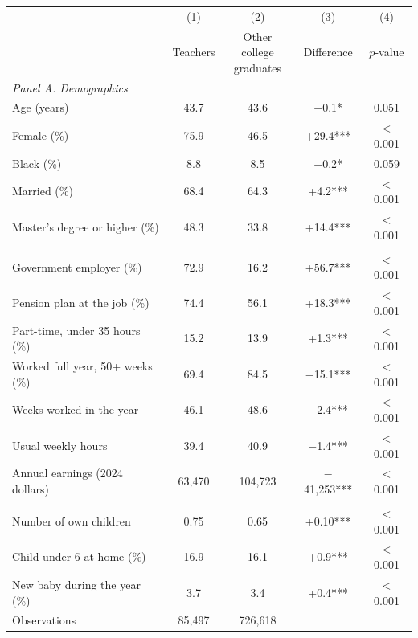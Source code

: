 \begin{tabular}{lcccc}
\toprule
 & (1) & (2) & (3) & (4) \\
 & Teachers & \makecell{Other college\\graduates} & Difference & $p$-value \\
\midrule
\multicolumn{5}{l}{\textit{Panel A. Demographics}} \\
Age (years) & 43.7 & 43.6 & +0.1* & 0.051 \\
Female (\%) & 75.9 & 46.5 & +29.4*** & $<$0.001 \\
Black (\%) & 8.8 & 8.5 & +0.2* & 0.059 \\
Married (\%) & 68.4 & 64.3 & +4.2*** & $<$0.001 \\
Master's degree or higher (\%) & 48.3 & 33.8 & +14.4*** & $<$0.001 \\
\addlinespace
\multicolumn{5}{l}{\textit{Panel B. The job}} \\
Government employer (\%) & 72.9 & 16.2 & +56.7*** & $<$0.001 \\
Pension plan at the job (\%) & 74.4 & 56.1 & +18.3*** & $<$0.001 \\
Part-time, under 35 hours (\%) & 15.2 & 13.9 & +1.3*** & $<$0.001 \\
Worked full year, 50+ weeks (\%) & 69.4 & 84.5 & $-$15.1*** & $<$0.001 \\
Weeks worked in the year & 46.1 & 48.6 & $-$2.4*** & $<$0.001 \\
Usual weekly hours & 39.4 & 40.9 & $-$1.4*** & $<$0.001 \\
Annual earnings (2024 dollars) & 63,470 & 104,723 & $-$41,253*** & $<$0.001 \\
\addlinespace
\multicolumn{5}{l}{\textit{Panel C. Family}} \\
Number of own children & 0.75 & 0.65 & +0.10*** & $<$0.001 \\
Child under 6 at home (\%) & 16.9 & 16.1 & +0.9*** & $<$0.001 \\
New baby during the year (\%) & 3.7 & 3.4 & +0.4*** & $<$0.001 \\
\midrule
Observations & 85,497 & 726,618 & & \\
\bottomrule
\end{tabular}
